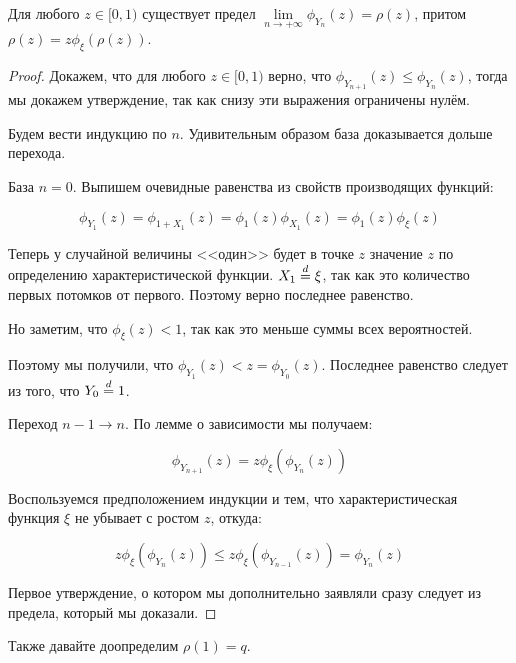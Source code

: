 \begin{lemma}
  Для любого $z \in [0, 1)$ существует предел $\lim\limits_{n \to +\infty} 
  \phi_{Y_n}(z) = \rho(z)$, притом $\rho(z) = z\phi_{\xi}(\rho(z))$.
\end{lemma}

\begin{proof}
  Докажем, что для любого $z \in [0, 1)$ верно, что
  $\phi_{Y_{n + 1}}(z) \leqslant \phi_{Y_n}(z)$, тогда мы докажем утверждение,
  так как снизу эти выражения ограничены нулём.

  Будем вести индукцию по $n$. Удивительным образом база доказывается дольше
  перехода. 

  База $n = 0$. Выпишем очевидные равенства из свойств производящих функций:

  \[
    \phi_{Y_1}(z) = \phi_{1 + X_1}(z) = \phi_{1}(z)\phi_{X_1}(z) = 
    \phi_{1}(z)\phi_{\xi}(z)
  \]

  Теперь у случайной величины <<один>> будет в точке $z$ значение $z$ по определению
  характеристической функции. $X_1 \overset{d}{=} \xi$, так как это количество
  первых потомков от первого. Поэтому верно последнее равенство.

  Но заметим, что $\phi_{\xi}(z) < 1$, так как это меньше суммы всех вероятностей.

  Поэтому мы получили, что $\phi_{Y_1}(z) < z = \phi_{Y_0}(z)$. Последнее равенство
  следует из того, что $Y_0 \overset{d}{=} 1$.

  Переход $n - 1 \to n$. По лемме о зависимости мы получаем:

  \[
    \phi_{Y_{n + 1}}(z) = z\phi_{\xi}(\phi_{Y_n}(z))
  \]

  Воспользуемся предположением индукции и тем, что характеристическая функция
  $\xi$ не убывает с ростом $z$, откуда:

  \[
    z\phi_{\xi}(\phi_{Y_n}(z)) \leqslant z\phi_{\xi}(\phi_{Y_{n - 1}}(z)) =
    \phi_{Y_n}(z)
  \]

  Первое утверждение, о котором мы дополнительно заявляли сразу следует из предела,
  который мы доказали.

\end{proof}

Также давайте доопределим $\rho(1) = q$.
